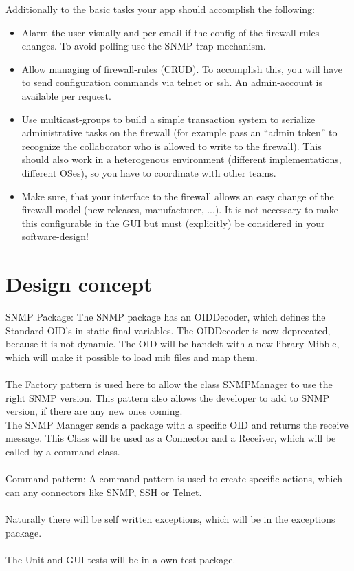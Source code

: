 \documentclass[a4paper,12pt]{scrreprt}
\begin{document}
Additionally to the basic tasks your app should accomplish the following:
\begin{itemize}


    \item Alarm the user visually and per email if the config of the firewall-rules changes. To avoid polling use the SNMP-trap mechanism.

    \item Allow managing of firewall-rules (CRUD). To accomplish this, you will have to send configuration commands via telnet or ssh. An admin-account is available per request.

    \item Use multicast-groups to build a simple transaction system to serialize administrative tasks on the firewall (for example pass an “admin token” to recognize the collaborator who is allowed to write to the firewall). This should also work in a heterogenous environment (different implementations, different OSes), so you have to coordinate with other teams.

    \item Make sure, that your interface to the firewall allows an easy change of the firewall-model (new releases, manufacturer, ...). It is not necessary to make this configurable in the GUI but must (explicitly) be considered in your software-design!
\end{itemize}

	
\chapter{Design concept}
	SNMP Package:
	The SNMP package has an OIDDecoder, which defines the Standard OID's in static final variables. The OIDDecoder is now deprecated, because it is not dynamic. 
	The OID will be handelt with a new library Mibble, which will make it possible to load mib files and map them.
	\\\\
	The Factory pattern is used here to allow the class SNMPManager to use the right SNMP version. This pattern also allows the developer to add to SNMP version, if there are any new ones coming.
	\\
	The SNMP Manager sends a package with a specific OID and returns the receive message. This Class will be used as a Connector and a Receiver, which will be called by a command class.
	\\\\
	Command pattern:
	A command pattern is used to create specific actions, which can any connectors like SNMP, SSH or Telnet.
	\\\\
	Naturally there will be self written exceptions, which will be in the exceptions package.
	\\\\
	The Unit and GUI tests will be in a own test package.   
\end{document}
